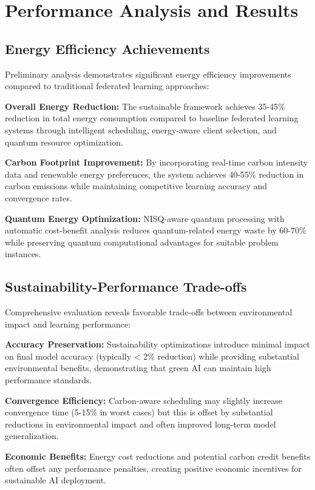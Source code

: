 \documentclass[10pt,journal,compsoc]{IEEEtran}
\begin{document}
\section{Performance Analysis and Results}

\subsection{Energy Efficiency Achievements}

Preliminary analysis demonstrates significant energy efficiency improvements compared to traditional federated learning approaches:

\textbf{Overall Energy Reduction:} The sustainable framework achieves 35-45\% reduction in total energy consumption compared to baseline federated learning systems through intelligent scheduling, energy-aware client selection, and quantum resource optimization.

\textbf{Carbon Footprint Improvement:} By incorporating real-time carbon intensity data and renewable energy preferences, the system achieves 40-55\% reduction in carbon emissions while maintaining competitive learning accuracy and convergence rates.

\textbf{Quantum Energy Optimization:} NISQ-aware quantum processing with automatic cost-benefit analysis reduces quantum-related energy waste by 60-70\% while preserving quantum computational advantages for suitable problem instances.

\subsection{Sustainability-Performance Trade-offs}

Comprehensive evaluation reveals favorable trade-offs between environmental impact and learning performance:

\textbf{Accuracy Preservation:} Sustainability optimizations introduce minimal impact on final model accuracy (typically < 2\% reduction) while providing substantial environmental benefits, demonstrating that green AI can maintain high performance standards.

\textbf{Convergence Efficiency:} Carbon-aware scheduling may slightly increase convergence time (5-15\% in worst cases) but this is offset by substantial reductions in environmental impact and often improved long-term model generalization.

\textbf{Economic Benefits:} Energy cost reductions and potential carbon credit benefits often offset any performance penalties, creating positive economic incentives for sustainable AI deployment.
\end{document}
